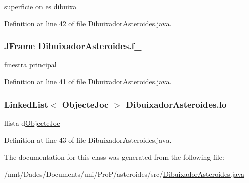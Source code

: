 superficie on es dibuixa 



Definition at line 42 of file Dibuixador\+Asteroides.\+java.

\hypertarget{class_dibuixador_asteroides_acd1dc7eee6ddda629759fc422566b11b}{}
\subsubsection[{f\+\_\+}]{\setlength{\rightskip}{0pt plus 5cm}J\+Frame Dibuixador\+Asteroides.\+f\+\_\+\hspace{0.3cm}{\ttfamily [private]}}\label{class_dibuixador_asteroides_acd1dc7eee6ddda629759fc422566b11b}


finestra principal 



Definition at line 41 of file Dibuixador\+Asteroides.\+java.

\hypertarget{class_dibuixador_asteroides_aafc049ca18d07bf9cf5f61b7e8e1e06f}{}
\subsubsection[{lo\+\_\+}]{\setlength{\rightskip}{0pt plus 5cm}Linked\+List$<$ {\bf Objecte\+Joc} $>$ Dibuixador\+Asteroides.\+lo\+\_\+\hspace{0.3cm}{\ttfamily [private]}}\label{class_dibuixador_asteroides_aafc049ca18d07bf9cf5f61b7e8e1e06f}


llista d\textquotesingle{}\hyperlink{interface_objecte_joc}{Objecte\+Joc} 



Definition at line 43 of file Dibuixador\+Asteroides.\+java.



The documentation for this class was generated from the following file\+:\begin{DoxyCompactItemize}
\item 
/mnt/\+Dades/\+Documents/uni/\+Pro\+P/asteroides/src/\hyperlink{_dibuixador_asteroides_8java}{Dibuixador\+Asteroides.\+java}\end{DoxyCompactItemize}
